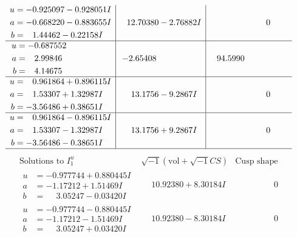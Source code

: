 \documentclass[1p]{elsarticle_modified}
\theoremstyle{definition}
\newcommand{\I}{\sqrt{-1}}
\begin{document}
$$\begin{array}{c|c|c}
\begin{aligned}
u &= -0.925097 - 0.928051 I \\
a &= -0.668220 - 0.883655 I \\
b &= \phantom{-}1.44462 - 0.22158 I\end{aligned}
 & \phantom{-}12.70380 - 2.76882 I & \phantom{-0.000000 } 0 \\ \hline\begin{aligned}
u &= -0.687552\phantom{ +0.000000I} \\
a &= \phantom{-}2.99846\phantom{ +0.000000I} \\
b &= \phantom{-}4.14675\phantom{ +0.000000I}\end{aligned}
 & -2.65408\phantom{ +0.000000I} & \phantom{-}94.5990\phantom{ +0.000000I} \\ \hline\begin{aligned}
u &= \phantom{-}0.961864 + 0.896115 I \\
a &= \phantom{-}1.53307 + 1.32987 I \\
b &= -3.56486 + 0.38651 I\end{aligned}
 & \phantom{-}13.1756 - 9.2867 I & \phantom{-0.000000 } 0 \\ \hline\begin{aligned}
u &= \phantom{-}0.961864 - 0.896115 I \\
a &= \phantom{-}1.53307 - 1.32987 I \\
b &= -3.56486 - 0.38651 I\end{aligned}
 & \phantom{-}13.1756 + 9.2867 I & \phantom{-0.000000 } 0\\
 \hline 
 \end{array}$$\newpage$$\begin{array}{c|c|c}  
\text{Solutions to }I^u_{1}& \I (\text{vol} + \sqrt{-1}CS) & \text{Cusp shape}\\
 \hline 
\begin{aligned}
u &= -0.977744 + 0.880445 I \\
a &= -1.17212 + 1.51469 I \\
b &= \phantom{-}3.05247 - 0.03420 I\end{aligned}
 & \phantom{-}10.92380 + 8.30184 I & \phantom{-0.000000 } 0 \\ \hline\begin{aligned}
u &= -0.977744 - 0.880445 I \\
a &= -1.17212 - 1.51469 I \\
b &= \phantom{-}3.05247 + 0.03420 I\end{aligned}
 & \phantom{-}10.92380 - 8.30184 I & \phantom{-0.000000 } 0 \\ \hline\begin{aligned}

\end{aligned}
\end{array}$$
\end{document}
